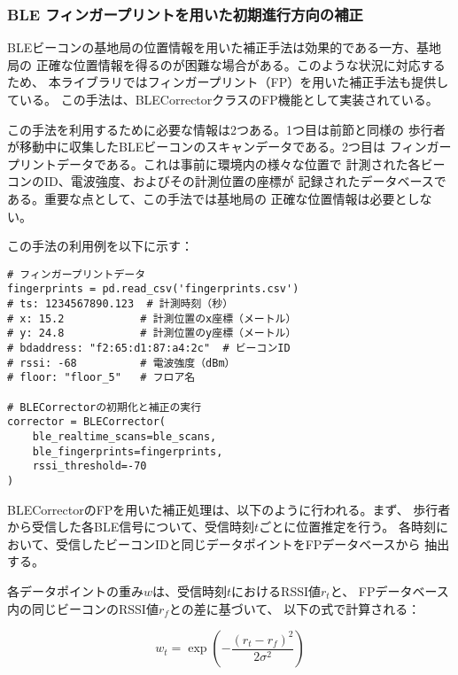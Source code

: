 
\subsubsection{BLE フィンガープリントを用いた初期進行方向の補正}

BLEビーコンの基地局の位置情報を用いた補正手法は効果的である一方、基地局の
正確な位置情報を得るのが困難な場合がある。このような状況に対応するため、
本ライブラリではフィンガープリント（FP）を用いた補正手法も提供している。
この手法は、BLECorrectorクラスのFP機能として実装されている。

この手法を利用するために必要な情報は2つある。1つ目は前節と同様の
歩行者が移動中に収集したBLEビーコンのスキャンデータである。2つ目は
フィンガープリントデータである。これは事前に環境内の様々な位置で
計測された各ビーコンのID、電波強度、およびその計測位置の座標が
記録されたデータベースである。重要な点として、この手法では基地局の
正確な位置情報は必要としない。

この手法の利用例を以下に示す：


\begin{lstlisting}[caption={BLECorrector},label=lst:rotate-trajectory-using-ble-fingerprint,float=ht]
# フィンガープリントデータ
fingerprints = pd.read_csv('fingerprints.csv')
# ts: 1234567890.123  # 計測時刻（秒）
# x: 15.2            # 計測位置のx座標（メートル）
# y: 24.8            # 計測位置のy座標（メートル）
# bdaddress: "f2:65:d1:87:a4:2c"  # ビーコンID
# rssi: -68          # 電波強度（dBm）
# floor: "floor_5"   # フロア名

# BLECorrectorの初期化と補正の実行
corrector = BLECorrector(
    ble_realtime_scans=ble_scans,
    ble_fingerprints=fingerprints,
    rssi_threshold=-70
)
\end{lstlisting}


BLECorrectorのFPを用いた補正処理は、以下のように行われる。まず、
歩行者から受信した各BLE信号について、受信時刻$t$ごとに位置推定を行う。
各時刻において、受信したビーコンIDと同じデータポイントをFPデータベースから
抽出する。

各データポイントの重み$w$は、受信時刻$t$におけるRSSI値$r_t$と、
FPデータベース内の同じビーコンのRSSI値$r_f$との差に基づいて、
以下の式で計算される：

\begin{equation}
w_t = \exp\left(-\frac{(r_t - r_f)^2}{2\sigma^2}\right)
\end{equation}

